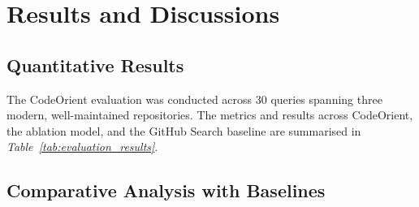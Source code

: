 \chapter{Results and Discussions}

\section{Quantitative Results}
The CodeOrient evaluation was conducted across 30 queries spanning three modern, well-maintained repositories. The metrics and results across CodeOrient, the ablation model, and the GitHub Search baseline are summarised in \textit{Table~\ref{tab:evaluation_results}}.

\begin{table}[htbp]
\centering
{}
\caption{\textit{Average Evaluation Metrics Across 30 Queries}}
\label{tab:evaluation_results}
\end{table}

\section{Comparative Analysis with Baselines}
